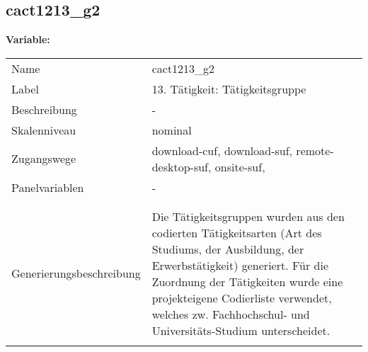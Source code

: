 	
	
	\subsection{cact1213\_g2}
	\label{subSection:cact1213_g2}

	\noindent\textbf{Variable:}\\
		\begin{tabular}{lL{11.3cm}}
			\label{tableVariable:cact1213_g2}
			Name & cact1213\_g2 \\
			Label & 13. Tätigkeit: Tätigkeitsgruppe  \\
			Beschreibung & - \\
			Skalenniveau & nominal \\
			Zugangswege &
				download-cuf,
				download-suf,
				remote-desktop-suf,
				onsite-suf,
 \\
			Panelvariablen & -
			 \\
			 \\
 \\
					Generierungsbeschreibung & Die Tätigkeitsgruppen wurden aus den codierten Tätigkeitsarten (Art des Studiums, der Ausbildung, der Erwerbstätigkeit) generiert. Für die Zuordnung der Tätigkeiten wurde eine projekteigene Codierliste verwendet, welches zw. Fachhochschul- und Universitäts-Studium unterscheidet.
				 \\	
			 \\
		\end{tabular}






